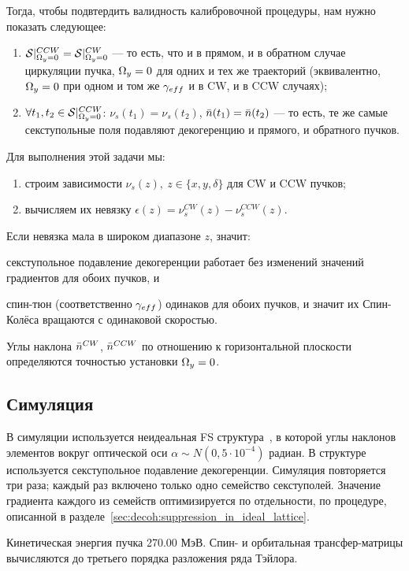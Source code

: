 Тогда, чтобы подвтердить валидность калибровочной процедуры, нам нужно показать следующее:
\begin{enumerate}
\item $\Stab*^{CCW} = \Stab*^{CW}$ --- то есть, что и в прямом, и в обратном случае циркуляции пучка,
  $\Omega_y = 0$ для одних и тех же траекторий (эквивалентно, $\Omega_y=0$ при одном и том же $\g*$ и в CW, и в CCW
  случаях);
\item $\forall t_1,t_2\in\Stab*^{CCW}$: $\nu_s(t_1) = \nu_s(t_2)$, $\bar n(t_1) = \bar n(t_2)$ ---
  то есть, те же самые секступольные поля подавляют декогеренцию и прямого, и обратного пучков.
\end{enumerate}

Для выполнения этой задачи мы:
\begin{enumerate}
\item строим зависимости $\nu_s(z),~z\in\{x,y,\delta\}$ для CW и CCW пучков;
\item вычисляем их невязку $\epsilon(z) = \nu_s^{CW}(z) - \nu_s^{CCW}(z)$.
\end{enumerate}

Если невязка мала в широком диапазоне $z$, значит:
\begin{enumerate*}[1)]
\item секступольное подавление декогеренции работает без изменений значений градиентов для обоих пучков, и
\item спин-тюн (соответственно $\g*$) одинаков для обоих пучков, и значит их Спин-Колёса
вращаются с одинаковой скоростью.
\end{enumerate*}

Углы наклона $\bar n^{CW}$, $\bar n^{CCW}$ по отношению к горизонтальной плоскости определяются точностью установки
$\Omega_y=0$.

\subsection{Симуляция}
В симуляции используется неидеальная FS структура~\cite{Senichev:Lattices}, в которой углы наклонов элементов
вокруг оптической оси $\alpha \sim N(0, 5\cdot10^{-4})$ радиан. В структуре используется секступольное
подавление декогеренции. Симуляция повторяется три раза; каждый раз
включено только одно семейство секступолей. Значение градиента каждого
из семейств оптимизируется по отдельности, по процедуре, описанной
в разделе~\ref{sec:decoh:suppression_in_ideal_lattice}.

Кинетическая энергия пучка 270.00 МэВ.
Спин- и орбитальная трансфер-матрицы вычисляются до третьего порядка разложения ряда Тэйлора.

